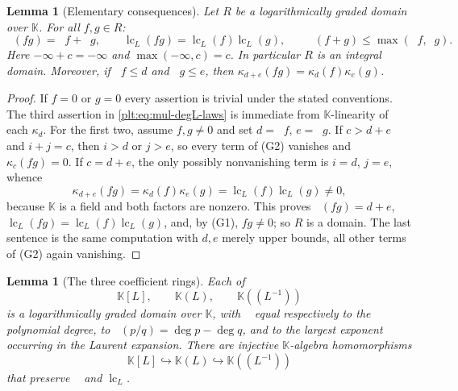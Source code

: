 \documentclass[11pt,oneside]{article}
\theoremstyle{plain}
\newtheorem{lemma}[theorem]{Lemma}
\theoremstyle{definition}
\theoremstyle{remark}
\newcommand{\K}{\mathbb{K}}
\DeclareMathOperator{\lc}{lc}
\DeclareMathOperator{\degL}{deg_{L}}
\begin{document}
\begin{lemma}[Elementary consequences]
\label{plt:lem:mul-graded-basics}
Let $R$ be a logarithmically graded domain over $\K$.  For all $f,g\in R$:
\begin{equation}\label{plt:eq:mul-degL-laws}
 \degL(fg)=\degL f+\degL g,
 \qquad
 \lc_L(fg)=\lc_L(f)\lc_L(g),
 \qquad
 \degL(f+g)\le\max(\degL f,\degL g).
\end{equation}
Here $-\infty+c=-\infty$ and $\max(-\infty,c)=c$.  In particular $R$ is an
integral domain.  Moreover, if $\degL f\le d$ and $\degL g\le e$, then
$\kappa_{d+e}(fg)=\kappa_d(f)\kappa_e(g)$.
\end{lemma}

\begin{proof}
If $f=0$ or $g=0$ every assertion is trivial under the stated conventions.
The third assertion in \eqref{plt:eq:mul-degL-laws} is immediate from
$\K$-linearity of each $\kappa_d$.  For the first two, assume $f,g\ne0$ and
set $d=\degL f$, $e=\degL g$.  If $c>d+e$ and $i+j=c$, then $i>d$ or $j>e$, so
every term of (G2) vanishes and $\kappa_c(fg)=0$.  If $c=d+e$, the only
possibly nonvanishing term is $i=d$, $j=e$, whence
\[
 \kappa_{d+e}(fg)=\kappa_d(f)\kappa_e(g)=\lc_L(f)\lc_L(g)\ne0,
\]
because $\K$ is a field and both factors are nonzero.  This proves
$\degL(fg)=d+e$, $\lc_L(fg)=\lc_L(f)\lc_L(g)$, and, by (G1), $fg\ne0$; so $R$
is a domain.  The last sentence is the same computation with $d,e$ merely
upper bounds, all other terms of (G2) again vanishing.
\end{proof}

\begin{lemma}[The three coefficient rings]
\label{plt:lem:mul-three-rings}
Each of
\[
 \K[L],\qquad \K(L),\qquad \K((L^{-1}))
\]
is a logarithmically graded domain over $\K$, with $\degL$ equal
respectively to the polynomial degree, to $\degL(p/q)=\deg p-\deg q$, and to
the largest exponent occurring in the Laurent expansion.  There are injective
$\K$-algebra homomorphisms
\begin{equation}\label{plt:eq:mul-coeff-chain}
 \K[L]\hookrightarrow\K(L)\hookrightarrow\K((L^{-1}))
\end{equation}
that preserve $\degL$ and $\lc_L$.
\end{lemma}
\end{document}
